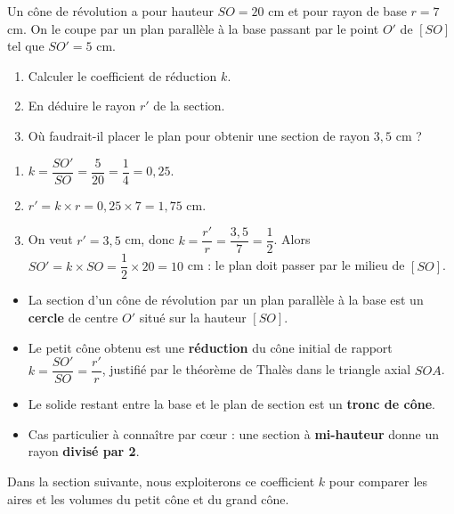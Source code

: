 \documentclass[11pt]{article}
\begin{document}
\begin{exercice}
Un cône de révolution a pour hauteur $SO = 20$ cm et pour rayon de base $r = 7$ cm. On le coupe par un plan parallèle à la base passant par le point $O'$ de $[SO]$ tel que $SO' = 5$ cm.
\begin{enumerate}
\item Calculer le coefficient de réduction $k$.
\item En déduire le rayon $r'$ de la section.
\item Où faudrait-il placer le plan pour obtenir une section de rayon $3,5$ cm ?
\end{enumerate}
\end{exercice}

\begin{corrige}
\begin{enumerate}
\item $k = \dfrac{SO'}{SO} = \dfrac{5}{20} = \dfrac{1}{4} = 0,25$.
\item $r' = k \times r = 0,25 \times 7 = 1,75$ cm.
\item On veut $r' = 3,5$ cm, donc $k = \dfrac{r'}{r} = \dfrac{3,5}{7} = \dfrac{1}{2}$. Alors $SO' = k \times SO = \dfrac{1}{2} \times 20 = 10$ cm : le plan doit passer par le milieu de $[SO]$.
\end{enumerate}
\end{corrige}

\begin{aretenir}
\begin{itemize}
\item La section d'un cône de révolution par un plan parallèle à la base est un \textbf{cercle} de centre $O'$ situé sur la hauteur $[SO]$.
\item Le petit cône obtenu est une \textbf{réduction} du cône initial de rapport $k = \dfrac{SO'}{SO} = \dfrac{r'}{r}$, justifié par le théorème de Thalès dans le triangle axial $SOA$.
\item Le solide restant entre la base et le plan de section est un \textbf{tronc de cône}.
\item Cas particulier à connaître par cœur : une section à \textbf{mi-hauteur} donne un rayon \textbf{divisé par 2}.
\end{itemize}
Dans la section suivante, nous exploiterons ce coefficient $k$ pour comparer les aires et les volumes du petit cône et du grand cône.
\end{aretenir}
\end{document}
